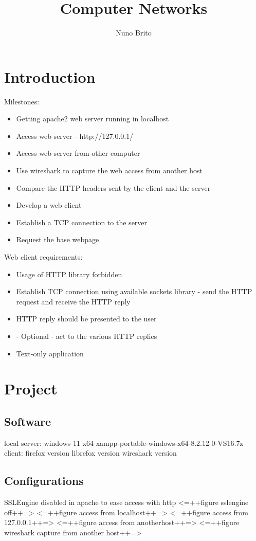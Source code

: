 \documentclass[11pt]{report}
\title{Computer Networks}
\author{Nuno Brito}
\begin{document}
\tableofcontents

\section{Introduction}
Milestones:
\begin{itemize}
    \item Getting apache2 web server running in localhost
    \item Access web server - http://127.0.0.1/
    \item Access web server from other computer
    \item Use wireshark to capture the web access from another host
    \item Compare the HTTP headers sent by the client and the server
    \item Develop a web client
    \item Establish a TCP connection to the server
    \item Request the base webpage
\end{itemize}

Web client requirements:
\begin{itemize}
    \item Usage of HTTP library forbidden
    \item Establish TCP connection using available sockets library - send the HTTP request and receive the HTTP reply
    \item HTTP reply should be presented to the user
    \item - Optional - act to the various HTTP replies
    \item Text-only application
\end{itemize}

\section{Project}
\subsection{Software}
    local server:
        windows 11 x64
        xampp-portable-windows-x64-8.2.12-0-VS16.7z
    client:
        firefox version
        librefox version
        wireshark version

\subsection{Configurations}
    SSLEngine disabled in apache to ease access with http
    <=++figure sslengine off++=>
    <=++figure access from localhost++=>
    <=++figure access from 127.0.0.1++=>
    <=++figure access from anotherhost++=>
    <=++figure wireshark capture from another host++=>
\end{document}
